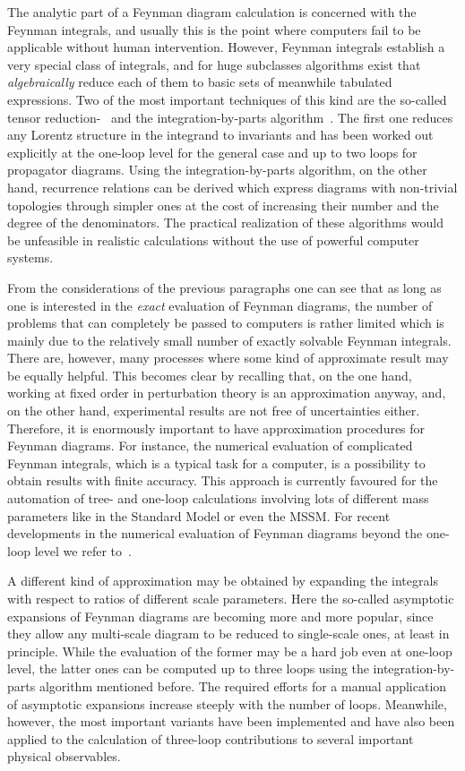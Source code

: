 The analytic part of a Feynman diagram calculation is concerned with the
Feynman integrals, and usually this is the point where computers fail to
be applicable without human intervention.  However, Feynman integrals
establish a very special class of integrals, and for huge subclasses
algorithms exist that {\em algebraically} reduce each of them to basic
sets of meanwhile tabulated expressions.  Two of the most important
techniques of this kind are the so-called tensor
reduction-~\cite{PasVel79} and the integration-by-parts
algorithm~\cite{CheTka81}.  The first one reduces any Lorentz structure
in the integrand to invariants and has been worked out explicitly at the
one-loop level for the general case and up to two loops for propagator
diagrams. Using the integration-by-parts algorithm, on the other hand,
recurrence relations can be derived which express diagrams with
non-trivial topologies through simpler ones at the cost of increasing
their number and the degree of the denominators.  The practical
realization of these algorithms would be unfeasible in realistic
calculations without the use of powerful computer systems.

From the considerations of the previous paragraphs one can see that as
long as one is interested in the {\it exact} evaluation of Feynman
diagrams, the number of problems that can completely be passed to
computers is rather limited which is mainly due to the relatively small
number of exactly solvable Feynman integrals. There are, however, many
processes where some kind of approximate result may be equally helpful.
This becomes clear by recalling that, on the one hand, working at fixed
order in perturbation theory is an approximation anyway, and, on the
other hand, experimental results are not free of uncertainties
either.
Therefore, it is enormously important to have approximation procedures
for Feynman diagrams. For instance, the numerical evaluation of
complicated Feynman integrals, which is a typical task for a computer,
is a possibility to obtain results with finite accuracy.
This approach is currently favoured for the automation of tree- and one-loop
calculations involving lots of different mass parameters like in the
Standard Model or even the MSSM. For recent developments in the
numerical evaluation of Feynman diagrams beyond the one-loop level
we refer to~\cite{numcalc}.

A different kind of approximation may be obtained by expanding the
integrals with respect to ratios of different scale parameters. Here the
so-called asymptotic expansions of Feynman diagrams are becoming more
and more popular, since they allow any multi-scale diagram to be reduced
to single-scale ones, at least in principle. While the evaluation of the
former may be a hard job even at one-loop level, the latter ones can be
computed up to three loops using the integration-by-parts algorithm
mentioned before.  The required efforts for a manual application of
asymptotic expansions increase steeply with the number of loops.
Meanwhile, however, the most important variants have been implemented
and have also been applied to the calculation of three-loop
contributions to several important physical observables.

